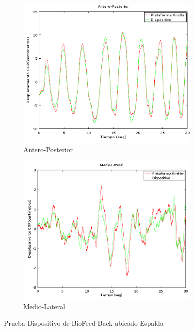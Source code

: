 \documentclass[12pt,a4paper]{article}
\newcommand{\nombreDispositivo}{Dispositivo de BioFeed-Back }
\begin{document}
	
	\begin{figure}[H]
		\centering
		\begin{subfigure}{.5\textwidth}
			\centering
			\includegraphics[width=1\linewidth]{images/pruebas/Espalda/Antero-Posterior}
			\caption{Antero-Posterior}
			\label{fig:anteroPosteriorEspalda}
		\end{subfigure}%
		\begin{subfigure}{.5\textwidth}
			\centering
			\includegraphics[width=1\linewidth]{images/pruebas/Espalda/Medio-Lateral}
			\caption{Medio-Lateral}
			\label{fig:medioLateralEspalda}
		\end{subfigure}
		\caption{Prueba \nombreDispositivo ubicado Espalda}
		\label{fig:pruebaEspalda}
	\end{figure}
	
\end{document}
